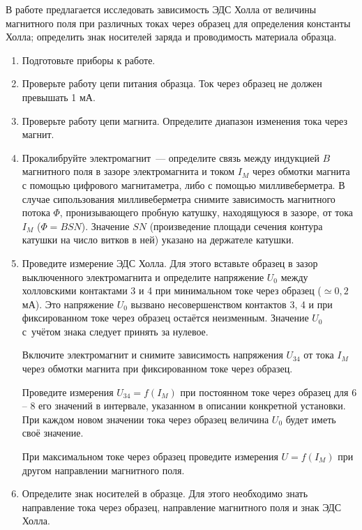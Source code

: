 \begin{lab:task}

В работе предлагается исследовать зависимость ЭДС Холла от величины магнитного поля при различных токах через образец для определения константы Холла; определить знак носителей заряда и проводимость материала образца.

\begin{enumerate}
\item{ Подготовьте приборы к работе.}

\item{ Проверьте работу цепи питания образца. Ток через образец не должен превышать 1 мА.}

\item{ Проверьте работу цепи магнита. Определите диапазон изменения тока через магнит.}

\item{ Прокалибруйте электромагнит~--- определите связь между индукцией $B$ магнитного поля в зазоре электромагнита и током $I_M$ через обмотки магнита с помощью цифрового магнитаметра, либо с помощью милливеберметра. В случае сипользования милливеберметра снимите зависимость магнитного потока $\Phi$, пронизывающего пробную катушку, находящуюся в зазоре, от тока $I_M$ ($\Phi=BSN$). Значение $SN$ (произведение площади сечения контура катушки на число витков в ней) указано на держателе катушки.}

\item{ Проведите измерение ЭДС Холла. Для этого вставьте образец в зазор выключенного электромагнита и определите напряжение $U_0$ между холловскими контактами 3 и 4 при минимальном токе через образец ($\simeq 0,2$ мА). Это напряжение $U_0$ вызвано несовершенством контактов 3, 4 и при фиксированном токе через образец остаётся неизменным. Значение $U_0$ с~учётом знака следует принять за нулевое.

Включите электромагнит и снимите зависимость напряжения $U_{34}$ от тока $I_M$ через обмотки магнита при фиксированном токе через образец.

Проведите измерения $U_{34}=f(I_{M})$ при постоянном токе через образец для 6 -- 8 его значений в интервале, указанном в описании конкретной установки. При каждом новом значении тока через образец величина $U_0$ будет иметь своё значение.

При максимальном токе через образец проведите измерения $U=f(I_{M})$ при другом направлении магнитного поля.}

\item{ Определите знак носителей в образце. Для этого необходимо знать направление тока через образец, направление магнитного поля и знак ЭДС Холла.

}
\end{enumerate}
\end{lab:task}
